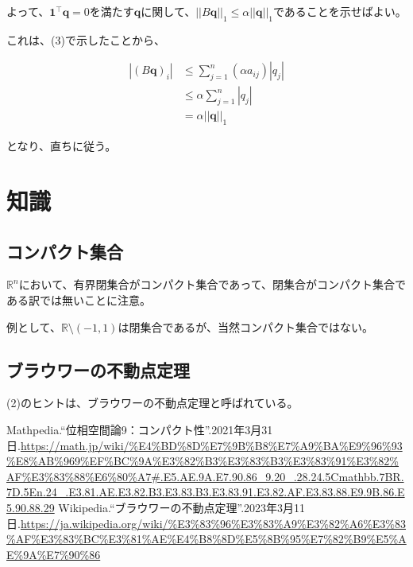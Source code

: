 \documentclass[a4paper, 10pt, dvipdfmx]{jlreq}
\begin{document}
よって、$\bm{1}^\top \bm{q}=0$を満たす$\bm{q}$に関して、$||B\bm{q}||_1\leq \alpha||\bm{q}||_1$であることを示せばよい。

これは、(3)で示したことから、

\begin{align*}
  |(B\bm{q})_i| & \leq \sum_{j=1}^n(\alpha a_{ij})|q_j| \\
                & \leq \alpha \sum_{j=1}^n |q_j|        \\
                & =\alpha ||\bm{q}||_1
\end{align*}

となり、直ちに従う。

\section{知識}

\subsection{コンパクト集合}

$\mathbb{R}^n$において、有界閉集合がコンパクト集合であって、閉集合がコンパクト集合である訳では無いことに注意。

例として、$\mathbb{R} \setminus (-1,1)$は閉集合であるが、当然コンパクト集合ではない。

\subsection{ブラウワーの不動点定理}

(2)のヒントは、ブラウワーの不動点定理と呼ばれている。


\begin{thebibliography}{9}
  Mathpedia.``位相空間論9：コンパクト性''.2021年3月31日.\url{https://math.jp/wiki/%E4%BD%8D%E7%9B%B8%E7%A9%BA%E9%96%93%E8%AB%969%EF%BC%9A%E3%82%B3%E3%83%B3%E3%83%91%E3%82%AF%E3%83%88%E6%80%A7#.E5.AE.9A.E7.90.86_9.20_.28.24.5Cmathbb.7BR.7D.5En.24_.E3.81.AE.E3.82.B3.E3.83.B3.E3.83.91.E3.82.AF.E3.83.88.E9.9B.86.E5.90.88.29}
  Wikipedia.``ブラウワーの不動点定理''.2023年3月11日.\url{https://ja.wikipedia.org/wiki/%E3%83%96%E3%83%A9%E3%82%A6%E3%83%AF%E3%83%BC%E3%81%AE%E4%B8%8D%E5%8B%95%E7%82%B9%E5%AE%9A%E7%90%86}
\end{thebibliography}
\end{document}
